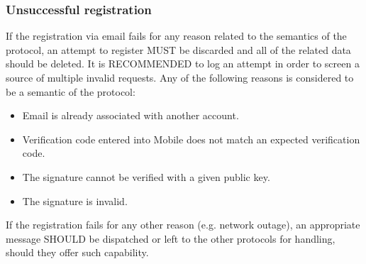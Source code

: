         \subsubsection{Unsuccessful registration}
        If the registration via email fails for any reason related to the semantics of the protocol, an attempt to
        register MUST be discarded and all of the related data should be deleted. It is RECOMMENDED to log an attempt
        in order to screen a source of multiple invalid requests. Any of the following reasons is considered to be
        a semantic of the protocol:
            \begin{itemize}
                \item Email is already associated with another account.
                \item Verification code entered into Mobile does not match an expected verification code.
                \item The signature cannot be verified with a given public key.
                \item The signature is invalid.
            \end{itemize}
        If the registration fails for any other reason (e.g. network outage), an appropriate message SHOULD be
        dispatched or left to the other protocols for handling, should they offer such capability.
